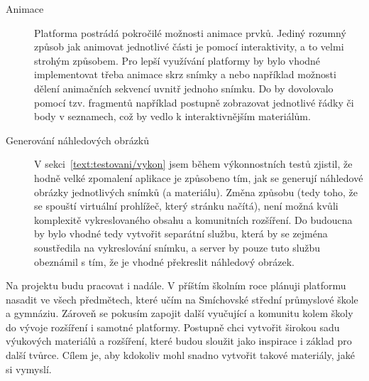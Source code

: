 \begin{description}
  \item[Animace] Platforma postrádá pokročilé možnosti animace prvků.
  Jediný rozumný způsob jak animovat jednotlivé části je pomocí interaktivity, a to velmi strohým způsobem.
  Pro lepší využívání platformy by bylo vhodné implementovat třeba animace skrz snímky a nebo například možnosti dělení animačních sekvencí uvnitř jednoho snímku.
  Do by dovolovalo pomocí tzv. fragmentů například postupně zobrazovat jednotlivé řádky či body v seznamech, což by vedlo k interaktivnějším materiálům.

  \item[Generování náhledových obrázků] V sekci~\ref{text:testovani/vykon} jsem během výkonnostních testů zjistil, že hodně velké zpomalení aplikace je způsobeno tím, jak se generují náhledové obrázky jednotlivých snímků (a materiálu).
  Změna způsobu (tedy toho, že se spouští virtuální prohlížeč, který stránku načítá), není možná kvůli komplexitě vykreslovaného obsahu a komunitních rozšíření.
  Do budoucna by bylo vhodné tedy vytvořit separátní službu, která by se zejména soustředila na vykreslování snímku, a server by pouze tuto službu obeznámil s tím, že je vhodné překreslit náhledový obrázek.
\end{description}

Na projektu budu pracovat i nadále. 
V příštím školním roce plánuji platformu nasadit ve všech předmětech, které učím na Smíchovské střední průmyslové škole a gymnáziu.
Zároveň se pokusím zapojit další vyučující a komunitu kolem školy do vývoje rozšíření i samotné platformy.
Postupně chci vytvořit širokou sadu výukových materiálů a rozšíření, které budou sloužit jako inspirace i základ pro další tvůrce. 
Cílem je, aby kdokoliv mohl snadno vytvořit takové materiály, jaké si vymyslí.
